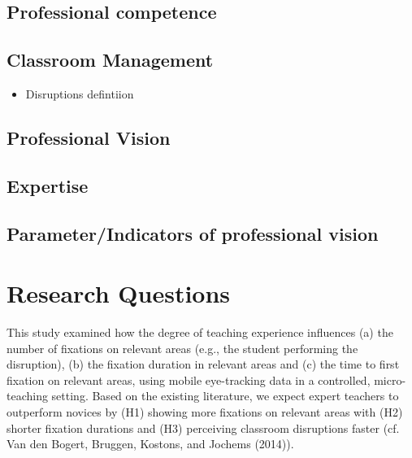 \documentclass[
  man,floatsintext]{apa6}
\providecommand{\tightlist}{%
  \setlength{\itemsep}{0pt}\setlength{\parskip}{0pt}}
\begin{document}
\hypertarget{professional-competence}{%
\subsection{Professional competence}\label{professional-competence}}

\hypertarget{classroom-management}{%
\subsection{Classroom Management}\label{classroom-management}}

\begin{itemize}
\tightlist
\item
  Disruptions defintiion
\end{itemize}

\hypertarget{professional-vision}{%
\subsection{Professional Vision}\label{professional-vision}}

\hypertarget{expertise}{%
\subsection{Expertise}\label{expertise}}

\hypertarget{parameterindicators-of-professional-vision}{%
\subsection{Parameter/Indicators of professional vision}\label{parameterindicators-of-professional-vision}}

\hypertarget{research-questions}{%
\section{Research Questions}\label{research-questions}}

This study examined how the degree of teaching experience influences (a) the number of fixations on relevant areas (e.g., the student performing the disruption), (b) the fixation duration in relevant areas and (c) the time to first fixation on relevant areas, using mobile eye-tracking data in a controlled, micro-teaching setting. Based on the existing literature, we expect expert teachers to outperform novices by (H1) showing more fixations on relevant areas with (H2) shorter fixation durations and (H3) perceiving classroom disruptions faster (cf. Van den Bogert, Bruggen, Kostons, and Jochems (2014)).
\end{document}
